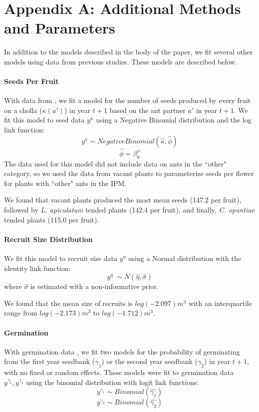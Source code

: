 \documentclass[11pt]{article}
\begin{document}
\newpage{}


\appendix
\label{appendix}
\section*{Appendix A: Additional Methods and Parameters} \label{appendix:A}
In addition to the models described in the body of the paper, we fit several other models using data from previous studies.
These models are described below.

\paragraph{Seeds Per Fruit}
With data from \cite{Miller2006}, we fit a model for the number of seeds produced by every fruit on a cholla ($\kappa(a')$) in year $t+1$ based on the ant partner $a'$ in year $t+1$.
We fit this model to seed data $y^{\kappa}$ using a Negative Binomial distribution and the log link function: 
$$y^{\kappa} \sim  Negative Binomial(\hat{\kappa},\hat{\phi})$$
$$\hat{\phi} = \beta_{0}^{\phi}$$
The data used for this model did not include data on ants in the ``other" category, so we used the data from vacant plants to parameterize seeds per flower for plants with ``other" ants in the IPM.

We found that vacant plants produced the most mean seeds (147.2 per fruit), followed by \textit{L. apiculatum} tended plants (142.4 per fruit), and finally, \textit{C. opuntiae} tended plants (115.0 per fruit).


\paragraph{Recruit Size Distribution}
We fit this model to recruit size data $y^{\eta}$ using a Normal distribution with the identity link function: 
$$y^{\eta} ~\sim N(\hat{\eta},\hat{\sigma})$$
where $\hat{\sigma}$ is estimated with a non-informative prior. 

We found that the mean size of recruits is $log(-2.097) m^3$ with an interquartile range from $log(-2.173) m^3$ to $log(-1.712) m^3$.



\paragraph{Germination}
With germination data \cite{Miller2007}, we fit two models for the probability of germinating from the first year seedbank ($\gamma_1$) or the second year seedbank ($\gamma_2$) in year $t+1$, with no fixed or random effects.
These models were fit to germination data $y^{\gamma_1}, y^{\gamma_2}$  using the binomial distribution with logit link functions:
$$y^{\gamma_1} \sim Binomial(\hat{\gamma_1})$$
$$y^{\gamma_2} \sim Binomial(\hat{\gamma_2})$$
\end{document}
